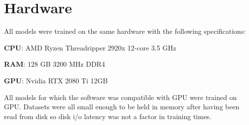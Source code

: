 \footnotesize
\renewcommand{\thechapter}{\Roman{chapter}}

\renewcommand{\thesection}{\Alph{section}.}

\chapter{Hardware}
\label{append:one}

All models were trained on the same hardware with the following specifications:

\quad\textbf{CPU}: AMD Ryzen Threadripper 2920x 12-core 3.5 GHz

\quad\textbf{RAM}: 128 GB 3200 MHz DDR4

\quad\textbf{GPU}: Nvidia RTX 2080 Ti 12GB

All models for which the software was compatible with GPU were trained on GPU.
Datasets were all small enough to be held in memory after having been read from disk so disk i/o latency was not a factor in training times.
